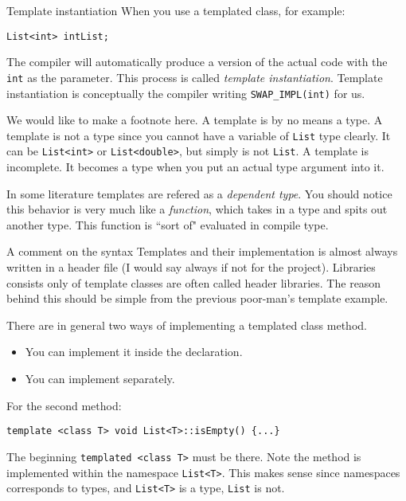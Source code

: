 \begin{frame}[fragile]{Template instantiation}
When you use a templated class, for example:
\begin{verbatim}
List<int> intList;
\end{verbatim}
The compiler will automatically produce a version of the actual code with the \texttt{int} as the parameter. This process is called \textit{template instantiation}. Template instantiation is conceptually the compiler writing \texttt{SWAP\_IMPL(int)} for us. 

We would like to make a footnote here. A template is by no means a type. A template is not a type since you cannot have a variable of \texttt{List} type clearly. It can be \texttt{List<int>} or \texttt{List<double>}, but simply is not \texttt{List}. A template is incomplete. It becomes a type when you put an actual type argument into it. 

In some literature templates are refered as a \textit{dependent type}.
You should notice this behavior is very much like a \textit{function}, which takes in a type and spits out another type. This function is ``sort of" evaluated in \alert{compile type}. 
\end{frame}

\begin{frame}[fragile]{A comment on the syntax}
Templates and \alert{their implementation} is almost always written in a header file (I would say always if not for the project). Libraries consists only of template classes are often called header libraries. The reason behind this should be simple from the previous poor-man's template example. 

There are in general two ways of implementing a templated class method. 
\begin{itemize}
	\item You can implement it inside the declaration.
	\item You can implement separately. 
\end{itemize}
For the second method:
\begin{verbatim}
template <class T> void List<T>::isEmpty() {...}
\end{verbatim}
\alert{The beginning \texttt{templated <class T>} must be there}. Note the method is implemented \alert{within the namespace \texttt{List<T>}}. This makes sense since namespaces corresponds to types, and \texttt{List<T>} is a type, \texttt{List} is not. 
\end{frame}

